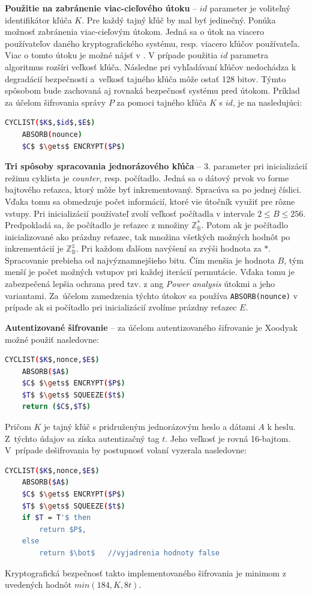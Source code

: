 \textbf{Použitie na zabránenie viac-cieľového útoku} -- $id$ parameter je voliteľný identifikátor kľúča $K$. Pre každý tajný kľúč by mal byť jedinečný. Ponúka možnosť zabránenia viac-cieľovým útokom. Jedná sa o útok na viacero používateľov daného kryptografického systému, resp. viacero kľúčov používateľa. Viac o tomto útoku je možné nájsť v \cite{mta}. V prípade použitia $id$ parametra algoritmus rozšíri veľkosť kľúča. Následne pri vyhľadávaní kľúčov nedochádza k degradácií bezpečnosti a~veľkosť tajného kľúča môže ostať 128 bitov. Týmto spôsobom bude zachovaná aj rovnaká bezpečnosť systému pred útokom. 
Príklad za účelom šifrovania správy $P$ za pomoci tajného kľúča $K$ s $id$, je na nasledujúci:
\begin{lstlisting}[language=bash, mathescape=true]
	CYCLIST($K$,$id$,$E$)
	ABSORB(nounce)
	$C$ $\gets$ ENCRYPT($P$)
\end{lstlisting}
\textbf{Tri spôsoby spracovania jednorázového kľúča} -- 3. parameter pri inicializácií režimu cyklista je \textit{counter}, resp. počítadlo. Jedná sa o dátový prvok vo forme bajtového reťazca, ktorý môže byť inkrementovaný. Spracúva sa po jednej číslici. Vďaka tomu sa obmedzuje počet informácií, ktoré vie útočník využiť pre rôzne vstupy. Pri inicializácií používateľ zvolí veľkosť počítadla v intervale $2 \leq B \leq 256$. Predpokladá sa, že počítadlo je reťazec z množiny $\mathbb{Z^*_B}$. Potom ak je počítadlo inicializované ako prázdny reťazec, tak množina všetkých možných hodnôt po inkrementácií je $\mathbb{Z^1_B}$. Pri každom ďalšom navýšení sa zvýši hodnota za $*$. Spracovanie prebieha od najvýznamnejšieho bitu. Čím menšia je hodnota $B$, tým menší je počet možných vstupov pri každej iterácií permutácie. Vďaka tomu je zabezpečená lepšia ochrana pred tzv. z ang \textit{Power analysis} \cite{paa} útokmi a jeho variantami. Za~účelom zamedzenia týchto útokov sa používa \lstinline|ABSORB(nounce)| v prípade ak si počítadlo pri inicializácií zvolíme prázdny reťazec $E$. 

\textbf{Autentizované šifrovanie} -- za účelom autentizovaného šifrovanie je Xoodyak možné použiť nasledovne:
\begin{lstlisting}[language=bash,mathescape=true]
	CYCLIST($K$,nonce,$E$)
	ABSORB($A$)
	$C$ $\gets$ ENCRYPT($P$)
	$T$ $\gets$ SQUEEZE($t$)
	return ($C$,$T$)
\end{lstlisting}
Pričom $K$ je tajný kľúč s pridruženým jednorázovým heslo a dátami $A$ k heslu. Z~týchto údajov sa získa autentizačný tag $t$. Jeho veľkosť je rovná 16-bajtom. V~prípade dešifrovania by postupnosť volaní vyzerala nasledovne: \\  
\begin{lstlisting}[language=bash,mathescape=true]
	CYCLIST($K$,nonce,$E$)
	ABSORB($A$)
	$C$ $\gets$ ENCRYPT($P$)
	$T$ $\gets$ SQUEEZE($t$)
	if $T = T'$ then 
		return $P$, 
	else 
		return $\bot$ 	//vyjadrenia hodnoty false 
\end{lstlisting}
Kryptografická bezpečnosť takto implementovaného šifrovania je minimom z uvedených hodnôt $min(184,K,8t)$.

